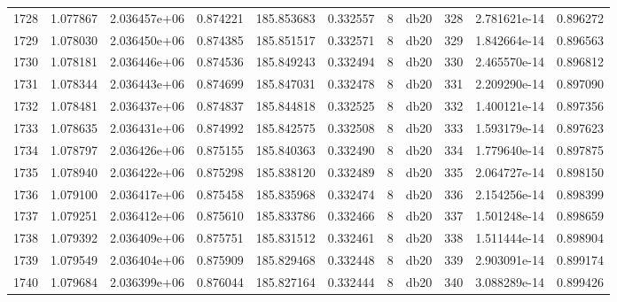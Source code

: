 \begin{tabular}{lrrrrrrlrrr}
1728 &    1.077867 &        2.036457e+06 &  0.874221 &              185.853683 &    0.332557 &       8 &         db20 &    328 &   2.781621e-14 &      0.896272 \\
1729 &    1.078030 &        2.036450e+06 &  0.874385 &              185.851517 &    0.332571 &       8 &         db20 &    329 &   1.842664e-14 &      0.896563 \\
1730 &    1.078181 &        2.036446e+06 &  0.874536 &              185.849243 &    0.332494 &       8 &         db20 &    330 &   2.465570e-14 &      0.896812 \\
1731 &    1.078344 &        2.036443e+06 &  0.874699 &              185.847031 &    0.332478 &       8 &         db20 &    331 &   2.209290e-14 &      0.897090 \\
1732 &    1.078481 &        2.036437e+06 &  0.874837 &              185.844818 &    0.332525 &       8 &         db20 &    332 &   1.400121e-14 &      0.897356 \\
1733 &    1.078635 &        2.036431e+06 &  0.874992 &              185.842575 &    0.332508 &       8 &         db20 &    333 &   1.593179e-14 &      0.897623 \\
1734 &    1.078797 &        2.036426e+06 &  0.875155 &              185.840363 &    0.332490 &       8 &         db20 &    334 &   1.779640e-14 &      0.897875 \\
1735 &    1.078940 &        2.036422e+06 &  0.875298 &              185.838120 &    0.332489 &       8 &         db20 &    335 &   2.064727e-14 &      0.898150 \\
1736 &    1.079100 &        2.036417e+06 &  0.875458 &              185.835968 &    0.332474 &       8 &         db20 &    336 &   2.154256e-14 &      0.898399 \\
1737 &    1.079251 &        2.036412e+06 &  0.875610 &              185.833786 &    0.332466 &       8 &         db20 &    337 &   1.501248e-14 &      0.898659 \\
1738 &    1.079392 &        2.036409e+06 &  0.875751 &              185.831512 &    0.332461 &       8 &         db20 &    338 &   1.511444e-14 &      0.898904 \\
1739 &    1.079549 &        2.036404e+06 &  0.875909 &              185.829468 &    0.332448 &       8 &         db20 &    339 &   2.903091e-14 &      0.899174 \\
1740 &    1.079684 &        2.036399e+06 &  0.876044 &              185.827164 &    0.332444 &       8 &         db20 &    340 &   3.088289e-14 &      0.899426 \\

\end{tabular}
